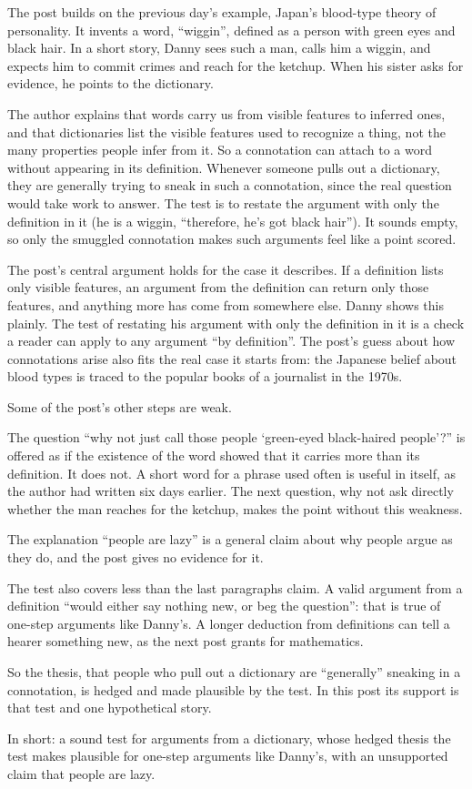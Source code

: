 \begin{afterword}
\summaryhead

The post builds on the previous day's example, Japan's blood-type theory of personality. It invents a word, ``wiggin'', defined as a person with green eyes and black hair. In a short story, Danny sees such a man, calls him a wiggin, and expects him to commit crimes and reach for the ketchup. When his sister asks for evidence, he points to the dictionary.

The author explains that words carry us from visible features to inferred ones, and that dictionaries list the visible features used to recognize a thing, not the many properties people infer from it. So a connotation can attach to a word without appearing in its definition. Whenever someone pulls out a dictionary, they are generally trying to sneak in such a connotation, since the real question would take work to answer. The test is to restate the argument with only the definition in it (he is a wiggin, ``therefore, he's got black hair''). It sounds empty, so only the smuggled connotation makes such arguments feel like a point scored.

\responsehead

The post's central argument holds for the case it describes. If a definition lists only visible features, an argument from the definition can return only those features, and anything more has come from somewhere else. Danny shows this plainly. The test of restating his argument with only the definition in it is a check a reader can apply to any argument ``by definition''. The post's guess about how connotations arise also fits the real case it starts from: the Japanese belief about blood types is traced to the popular books of a journalist in the 1970s.

Some of the post's other steps are weak.

The question ``why not just call those people `green-eyed black-haired people'?'' is offered as if the existence of the word showed that it carries more than its definition. It does not. A short word for a phrase used often is useful in itself, as the author had written six days earlier. The next question, why not ask directly whether the man reaches for the ketchup, makes the point without this weakness.

The explanation ``people are lazy'' is a general claim about why people argue as they do, and the post gives no evidence for it.

The test also covers less than the last paragraphs claim. A valid argument from a definition ``would either say nothing new, or beg the question'': that is true of one-step arguments like Danny's. A longer deduction from definitions can tell a hearer something new, as the next post grants for mathematics.

So the thesis, that people who pull out a dictionary are ``generally'' sneaking in a connotation, is hedged and made plausible by the test. In this post its support is that test and one hypothetical story.

In short: a sound test for arguments from a dictionary, whose hedged thesis the test makes plausible for one-step arguments like Danny's, with an unsupported claim that people are lazy.
\end{afterword}
